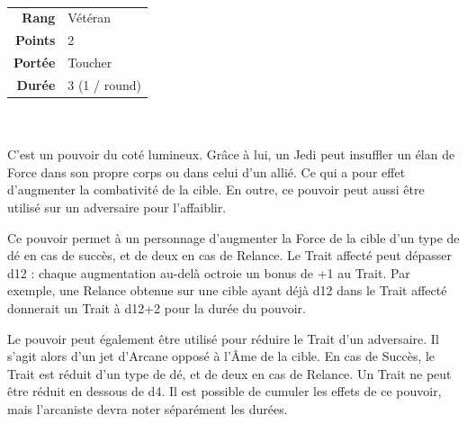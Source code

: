 \begin{description}[align=left] 

    \item [Chaleur de Force] ~ \\

        \begin{tabular}{ r l }
            \textbf{Rang}    & Vétéran \\
            \textbf{Points}  & 2 \\
            \textbf{Portée}  & Toucher \\
            \textbf{Durée}   & 3 (1 / round) \\
        \end{tabular}
        \\ \\
        C’est un pouvoir du coté lumineux. Grâce à lui, un Jedi peut insuffler un élan de Force dans son propre corps ou dans celui d’un allié. Ce qui a pour effet d’augmenter la combativité de la cible. En outre, ce pouvoir peut aussi être utilisé sur un adversaire pour l’affaiblir.

        Ce pouvoir permet à un personnage d’augmenter la Force de la cible d’un type de dé en cas de succès, et de deux en cas de Relance. Le Trait affecté peut dépasser d12 : chaque augmentation au-delà octroie un bonus de +1 au Trait. Par exemple, une Relance obtenue sur une cible ayant déjà d12 dans le Trait affecté donnerait un Trait à d12+2 pour la durée du pouvoir. 

        Le pouvoir peut également être utilisé pour réduire le Trait d’un adversaire. Il s’agit alors d’un jet d’Arcane opposé à l’Âme de la cible. En cas de Succès, le Trait est réduit d’un type de dé, et de deux en cas de Relance. Un Trait ne peut être réduit en dessous de d4. Il est possible de cumuler les effets de ce pouvoir, mais l’arcaniste devra noter séparément les durées.
        \\

    \item [Guérison de Force] ~ \\


\end{description}

